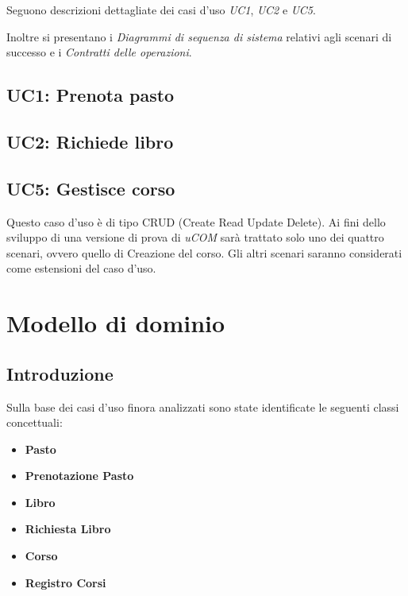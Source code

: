 \documentclass[12pt]{report}
\begin{document}
	Seguono descrizioni dettagliate dei casi d'uso \textit{UC1}, \textit{UC2} e \textit{UC5}.
	
	Inoltre si presentano i \textit{Diagrammi di sequenza di sistema} relativi agli scenari di successo e i \textit{Contratti delle operazioni}.
	
	\subsection{UC1: Prenota pasto}

		

	\newpage

	\subsection{UC2: Richiede libro}

		

	\newpage

	\subsection{UC5: Gestisce corso}

	Questo caso d'uso è di tipo CRUD (Create Read Update Delete). Ai fini dello sviluppo di una versione di prova di \textit{uCOM} sarà trattato solo uno dei quattro scenari, ovvero quello di Creazione del corso. Gli altri scenari saranno considerati come estensioni del caso d'uso.

		
	
	\newpage
	
	
	\section{Modello di dominio}
	
	\subsection{Introduzione}
	
	Sulla base dei casi d'uso finora analizzati sono state identificate le seguenti classi concettuali:
	\begin{itemize}
		\item \textbf{Pasto}
		\item \textbf{Prenotazione Pasto}		
		\item \textbf{Libro}
		\item \textbf{Richiesta Libro}
		\item \textbf{Corso}
		\item \textbf{Registro Corsi}
	\end{itemize}
\end{document}
